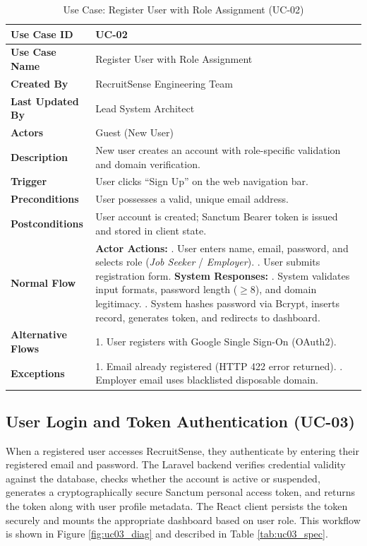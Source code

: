 \begin{table}[h!]
\centering
\small
\caption{Use Case: Register User with Role Assignment (UC-02)}
\label{tab:uc02_spec}
\begin{tabular}{|p{3.5cm}|p{11.5cm}|}
\hline
\textbf{Use Case ID} & UC-02 \\ \hline
\textbf{Use Case Name} & Register User with Role Assignment \\ \hline
\textbf{Created By} & RecruitSense Engineering Team \\ \hline
\textbf{Last Updated By} & Lead System Architect \\ \hline
\textbf{Actors} & Guest (New User) \\ \hline
\textbf{Description} & New user creates an account with role-specific validation and domain verification. \\ \hline
\textbf{Trigger} & User clicks ``Sign Up'' on the web navigation bar. \\ \hline
\textbf{Preconditions} & User possesses a valid, unique email address. \\ \hline
\textbf{Postconditions} & User account is created; Sanctum Bearer token is issued and stored in client state. \\ \hline
\textbf{Normal Flow} & 
\textbf{Actor Actions:} \newline
1. User enters name, email, password, and selects role (\textit{Job Seeker} / \textit{Employer}). \newline
3. User submits registration form. \newline
\textbf{System Responses:} \newline
2. System validates input formats, password length ($\ge 8$), and domain legitimacy. \newline
4. System hashes password via Bcrypt, inserts record, generates token, and redirects to dashboard. \\ \hline
\textbf{Alternative Flows} & 1. User registers with Google Single Sign-On (OAuth2). \\ \hline
\textbf{Exceptions} & 1. Email already registered (HTTP 422 error returned). \newline 2. Employer email uses blacklisted disposable domain. \\ \hline
\end{tabular}
\end{table}

\subsection{User Login and Token Authentication (UC-03)}
When a registered user accesses RecruitSense, they authenticate by entering their registered email and password. The Laravel backend verifies credential validity against the database, checks whether the account is active or suspended, generates a cryptographically secure Sanctum personal access token, and returns the token along with user profile metadata. The React client persists the token securely and mounts the appropriate dashboard based on user role. This workflow is shown in Figure \ref{fig:uc03_diag} and described in Table \ref{tab:uc03_spec}.

